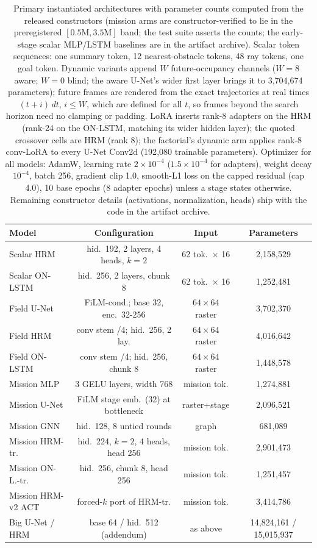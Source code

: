 \documentclass[letterpaper]{article} %
\begin{document}
\begin{table}[t]
\centering
\small
\setlength{\tabcolsep}{1.6pt}
\begin{tabular}{@{}lccc@{}}
\toprule
Model & Configuration & Input & Parameters \\
\midrule
Scalar HRM & hid.\ 192, 2 layers, 4 heads, $k{=}2$ & 62 tok.\ $\times$ 16 & 2{,}158{,}529 \\
Scalar ON-LSTM & hid.\ 256, 2 layers, chunk 8 & 62 tok.\ $\times$ 16 & 1{,}252{,}481 \\
Field U-Net & FiLM-cond.; base 32, enc.\ 32-256 & $64{\times}64$ raster & 3{,}702{,}370 \\
Field HRM & conv stem /4; hid.\ 256, 2 lay. & $64{\times}64$ raster & 4{,}016{,}642 \\
Field ON-LSTM & conv stem /4; hid.\ 256, chunk 8 & $64{\times}64$ raster & 1{,}448{,}578 \\
\midrule
Mission MLP & 3 GELU layers, width 768 & mission tok. & 1{,}274{,}881 \\
Mission U-Net & FiLM stage emb.\ (32) at bottleneck & raster+stage & 2{,}096{,}521 \\
Mission GNN & hid.\ 128, 8 untied rounds & graph & 681{,}089 \\
Mission HRM-tr. & hid.\ 224, $k{=}2$, 4 heads, head 256 & mission tok. & 2{,}901{,}473 \\
Mission ON-L.-tr. & hid.\ 256, chunk 8, head 256 & mission tok. & 1{,}251{,}457 \\
Mission HRM-v2 ACT & forced-$k$ port of HRM-tr. & mission tok. & 3{,}414{,}786 \\
Big U-Net / HRM & base 64 / hid.\ 512 (addendum) & as above & 14{,}824{,}161 / 15{,}015{,}937 \\
\bottomrule
\end{tabular}
\caption{Primary instantiated architectures with parameter counts computed from the released constructors (mission arms are constructor-verified to lie in the preregistered $[0.5\mathrm{M}, 3.5\mathrm{M}]$ band; the test suite asserts the counts; the early-stage scalar MLP/LSTM baselines are in the artifact archive). Scalar token sequences: one summary token, 12 nearest-obstacle tokens, 48 ray tokens, one goal token. Dynamic variants append $W$ future-occupancy channels ($W{=}8$ aware; $W{=}0$ blind; the aware U-Net's wider first layer brings it to 3{,}704{,}674 parameters); future frames are rendered from the exact trajectories at real times $(t{+}i)\,dt$, $i \le W$, which are defined for all $t$, so frames beyond the search horizon need no clamping or padding. LoRA \citep{hu2021lora} inserts rank-8 adapters on the HRM (rank-24 on the ON-LSTM, matching its wider hidden layer); the quoted crossover cells are HRM (rank 8); the factorial's dynamic arm applies rank-8 conv-LoRA to every U-Net Conv2d (192{,}080 trainable parameters). Optimizer for all models: AdamW, learning rate $2{\times}10^{-4}$ ($1.5{\times}10^{-4}$ for adapters), weight decay $10^{-4}$, batch 256, gradient clip 1.0, smooth-L1 loss on the capped residual (cap 4.0), 10 base epochs (8 adapter epochs) unless a stage states otherwise. Remaining constructor details (activations, normalization, heads) ship with the code in the artifact archive.}

\end{table}
\end{document}
